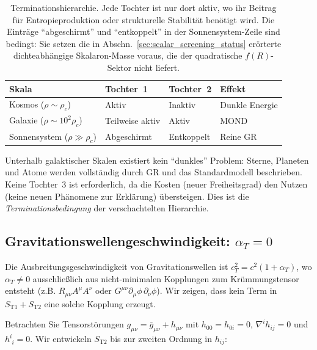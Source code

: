 \documentclass[aps,prd,twocolumn,superscriptaddress,nofootinbib]{revtex4-2}
\begin{document}
\begin{table}[tbp]
\caption{\label{tab:termination}Terminationshierarchie. Jede Tochter ist nur dort aktiv, wo ihr Beitrag f\"ur Entropieproduktion oder strukturelle Stabilit\"at ben\"otigt wird. Die Eintr\"age ``abgeschirmt'' und ``entkoppelt'' in der Sonnensystem-Zeile sind bedingt: Sie setzen die in Abschn.~\ref{sec:scalar_screening_status} er\"orterte dichteabh\"angige Skalaron-Masse voraus, die der quadratische $f(R)$-Sektor nicht liefert.}
\begin{ruledtabular}
\begin{tabular}{llll}
Skala & Tochter~1 & Tochter~2 & Effekt \\
\hline
Kosmos ($\rho \sim \rho_c$) & Aktiv & Inaktiv & Dunkle Energie \\
Galaxie ($\rho \sim 10^2\rho_c$) & Teilweise aktiv & Aktiv & MOND \\
Sonnensystem ($\rho \gg \rho_c$) & Abgeschirmt & Entkoppelt & Reine GR \\
\end{tabular}
\end{ruledtabular}
\end{table}

Unterhalb galaktischer Skalen existiert kein ``dunkles'' Problem: Sterne, Planeten und Atome werden vollst\"andig durch GR und das Standardmodell beschrieben. Keine Tochter~3 ist erforderlich, da die Kosten (neuer Freiheitsgrad) den Nutzen (keine neuen Ph\"anomene zur Erkl\"arung) \"ubersteigen. Dies ist die \textit{Terminationsbedingung} der verschachtelten Hierarchie.

\subsection{Gravitationswellengeschwindigkeit: $\alpha_T = 0$}
\label{sec:alpha_T}

Die Ausbreitungsgeschwindigkeit von Gravitationswellen ist $c_T^2 = c^2(1 + \alpha_T)$, wo $\alpha_T \neq 0$ ausschlie\ss{}lich aus nicht-minimalen Kopplungen zum Kr\"ummungstensor entsteht (z.B. $R_{\mu\nu}A^\mu A^\nu$ oder $G^{\mu\nu}\partial_\mu\phi\,\partial_\nu\phi$). Wir zeigen, dass kein Term in $S_{\mathrm{T1}} + S_{\mathrm{T2}}$ eine solche Kopplung erzeugt.

Betrachten Sie Tensorst\"orungen $g_{\mu\nu} = \bar{g}_{\mu\nu} + h_{\mu\nu}$ mit $h_{00} = h_{0i} = 0$, $\nabla^i h_{ij} = 0$ und $h^i_{\phantom{i}i} = 0$. Wir entwickeln $S_{\mathrm{T2}}$ bis zur zweiten Ordnung in $h_{ij}$:
\end{document}
